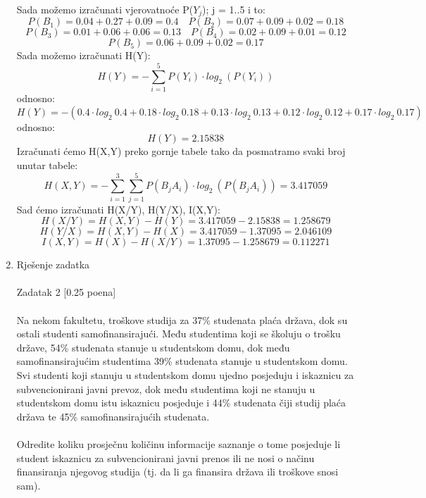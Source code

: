 \documentclass[12pt]{article}
\begin{document}
\begin{enumerate}
Sada možemo izračunati vjerovatnoće P(${Y_j}$); j = 1..5 i to:
\begin{equation*}
    P(B_1) = 0.04 + 0.27 + 0.09 = 0.4 \quad P(B_2) = 0.07 + 0.09 + 0.02 = 0.18
\end{equation*}
\begin{equation*}
    P(B_3) = 0.01 + 0.06 + 0.06 = 0.13 \quad P(B_4) = 0.02 + 0.09 + 0.01 = 0.12
\end{equation*}
\begin{equation*}
    P(B_5) = 0.06 + 0.09 + 0.02 = 0.17
\end{equation*}
\newpage
Sada možemo izračunati H(Y):
\begin{equation*}
    H(Y) = - \sum_{i = 1}^5 P(Y_i) \cdot log_2~(P(Y_i))
\end{equation*}
odnosno:
\begin{equation*}
    H(Y) = - (0.4 \cdot log_2~0.4 + 0.18 \cdot log_2~0.18 + 0.13 \cdot log_2~0.13
    + 0.12 \cdot log_2~0.12 + 0.17 \cdot log_2~0.17)
\end{equation*}
odnosno:
\begin{equation*}
    H(Y) = 2.15838
\end{equation*}
Izračunati ćemo H(X,Y) preko gornje tabele tako da posmatramo svaki broj unutar tabele:
\begin{equation*}
    H(X,Y) = - \sum_{i = 1}^3\sum_{j = 1}^5 P(B_jA_i) \cdot log_2~(P(B_jA_i)) = 3.417059
\end{equation*}
Sad ćemo izračunati H(X/Y), H(Y/X), I(X,Y):
\begin{equation*}
    H(X/Y) = H(X,Y) - H(Y) = 3.417059 - 2.15838 = 1.258679
\end{equation*}
\begin{equation*}
    H(Y/X) = H(X,Y) - H(X) = 3.417059 - 1.37095 = 2.046109
\end{equation*}
\begin{equation*}
    I(X,Y) = H(X) - H(X/Y) = 1.37095 - 1.258679 = 0.112271
\end{equation*}
		\item Rješenje zadatka \\
		\\
		Zadatak 2 [0.25 poena] \\
        \\
Na nekom fakultetu, troškove studija za 37\% studenata plaća država, dok su ostali studenti samofinansirajući. Među studentima koji se školuju o trošku države, 54\% studenata stanuje u studentskom domu, dok među samofinansirajućim studentima 39\% studenata stanuje u studentskom domu. Svi studenti koji stanuju u studentskom domu ujedno posjeduju i iskaznicu za subvencionirani javni prevoz, dok među studentima koji ne stanuju u studentskom domu istu iskaznicu posjeduje i 44\% studenata čiji studij plaća država te 45\% samofinansirajućih studenata. \\
\\
Odredite koliku prosječnu količinu informacije saznanje o tome posjeduje li student iskaznicu za subvencionirani javni prenos ili ne nosi o načinu finansiranja njegovog studija (tj. da li ga finansira država ili troškove snosi sam). \\
\\


\end{enumerate}
\end{document}
